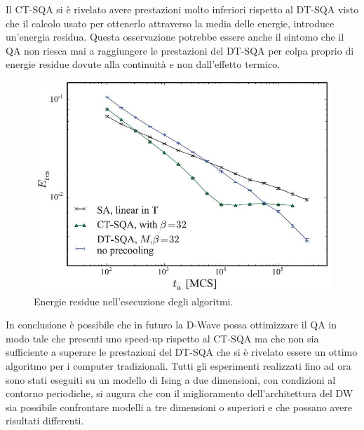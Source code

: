 Il CT-SQA si è rivelato avere prestazioni molto inferiori rispetto al DT-SQA visto che il calcolo usato per ottenerlo attraverso la media delle energie, introduce un'energia residua. Questa osservazione potrebbe essere anche il sintomo che il QA non riesca mai a raggiungere le prestazioni del DT-SQA per colpa proprio di energie residue dovute alla continuità e non dall'effetto termico.

\begin{figure}[htbp]
  \centering
  \includegraphics[scale=0.6]{Immagini/residua.jpg}
  \caption{Energie residue nell'esecuzione degli algoritmi.}
  \label{figura:residua}
\end{figure}

In conclusione è possibile che in futuro la D-Wave possa ottimizzare il QA in modo tale che presenti uno speed-up rispetto al CT-SQA ma che non sia sufficiente a superare le prestazioni del DT-SQA che si è rivelato essere un ottimo algoritmo per i computer tradizionali. Tutti gli esperimenti realizzati fino ad ora sono stati eseguiti su un modello di Ising a due dimensioni, con condizioni al contorno periodiche, si augura che con il miglioramento dell'architettura del DW sia possibile confrontare modelli a tre dimensioni o superiori e che possano avere risultati differenti.
